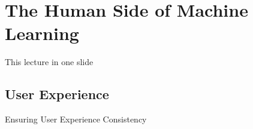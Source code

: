 
\section[Human Side]{The Human Side of Machine Learning}


\begin{frame}{This lecture in one slide}
  \begin{withmargin}
    \begin{tdmain}
    \end{tdmain}
    \begin{tdmargin}
    \end{tdmargin}
  \end{withmargin}
\end{frame}

\subsection{User Experience}

\begin{frame}{Ensuring User Experience Consistency}
  \begin{withmargin}
    \begin{tdmain}
    \end{tdmain}
    \begin{tdmargin}
    \end{tdmargin}
  \end{withmargin}
\end{frame}

